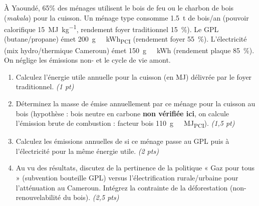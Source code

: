 \documentclass[11pt]{article}
\begin{document}
\begin{exercice}
À Yaoundé, 65\% des ménages utilisent le bois de feu ou le charbon de bois (\textit{makala}) pour la cuisson. Un ménage type consomme \SI{1,5}{\tonne} de bois/an (pouvoir calorifique \SI{15}{\mega\joule\per\kilogram}, rendement foyer traditionnel \SI{15}{\percent}). Le GPL (butane/propane) émet \SI{200}{g  \per \kWh_{PCI}} (rendement foyer \SI{55}{\percent}). L'électricité (mix hydro/thermique Cameroun) émet \SI{150}{g  \per \kWh} (rendement plaque \SI{85}{\percent}). On néglige les émissions non- et le cycle de vie amont.

\begin{enumerate}
    \item Calculez l'énergie utile annuelle pour la cuisson (en \si{\mega\joule}) délivrée par le foyer traditionnel. \textit{(1 pt)}
    \item Déterminez la masse de  émise annuellement par ce ménage pour la cuisson au bois (hypothèse : bois neutre en carbone \textbf{non vérifiée ici}, on calcule l'émission brute de combustion : facteur  bois \approx \SI{110}{g  \per \mega\joule_{PCI}}). \textit{(1,5 pt)}
    \item Calculez les émissions annuelles de  si ce ménage passe au GPL puis à l'électricité pour la même énergie utile. \textit{(2 pts)}
    \item Au vu des résultats, discutez de la pertinence de la politique « Gaz pour tous » (subvention bouteille GPL) versus l'électrification rurale/urbaine pour l'atténuation au Cameroun. Intégrez la contrainte de la déforestation (non-renouvelabilité du bois). \textit{(2,5 pts)}
\end{enumerate}
\end{exercice}
\end{document}

